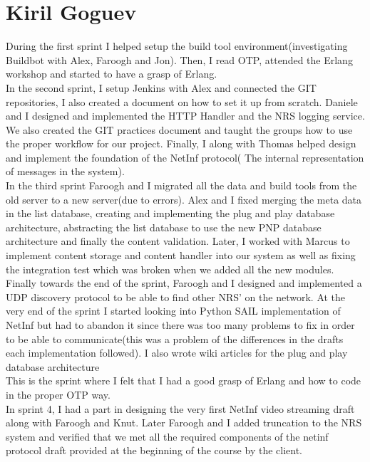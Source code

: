 \section{Kiril Goguev}

During the first sprint I helped setup the build tool environment(investigating Buildbot with Alex, Faroogh and Jon). Then, I read OTP, attended the Erlang workshop and started to have a grasp of Erlang.\\

In the second sprint, I setup Jenkins with Alex and connected the GIT repositories, I also created a document on how to set it up from scratch. 
Daniele and I designed and implemented the HTTP Handler and the NRS logging service. We also created the GIT practices document and taught the groups how to use the proper workflow for our project. Finally,
I along with Thomas helped design and implement the foundation of the NetInf protocol( The internal representation of messages in the system).\\


In the third sprint
Faroogh and I migrated all the data and build tools from the old server to a new server(due to errors).
Alex and I fixed merging the meta data in the list database, creating and implementing the plug and play database architecture, abstracting the list database to use the new PNP database architecture and finally the content validation. 
Later, I worked with Marcus to implement content storage and content handler into our system as well as fixing the integration test which was broken when we added all the new modules. 
Finally towards the end of the sprint, Faroogh and I designed and implemented a UDP discovery protocol to be able to find other NRS' on the network.
At the very end of the sprint I started looking into Python SAIL implementation of NetInf but had to abandon it since there was too many problems to fix in order to be able to communicate(this was a problem of the differences in the drafts each implementation followed). 
I also wrote wiki articles for the plug and play database architecture\\

This is the sprint where I felt that I had a good grasp of Erlang and how to code in the proper OTP way. \\

In sprint 4,
I had a part in designing the very first NetInf video streaming draft along with Faroogh and Knut. 
Later Faroogh and I added truncation to the NRS system and verified that we met all the required components of the netinf protocol draft provided at the beginning of the course by the client. \\

